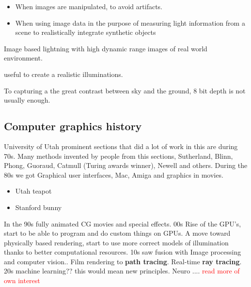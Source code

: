 \begin{itemize}
	\item When images are manipulated, to avoid artifacts.
	\item When using image data in the purpose of measuring light information from a scene to realistically integrate synthetic objects 
\end{itemize}


Image based lightning with high dynamic range images of real world environment. 

useful to create a realistic illuminations. 

To capturing a the great contrast between sky and the ground, 8 bit depth is not usually enough.  

\subsection*{Computer graphics history}
University of Utah prominent sections that did a lot of work in this are during 70s. Many methods invented by people from this sections, Sutherland, Blinn, Phong, Guoraud, Catmull (Turing awards winner), Newell and others. During the 80s we got Graphical user interfaces, Mac, Amiga and graphics in movies. 

\begin{itemize}
	\item Utah teapot
	\item Stanford bunny
\end{itemize}

In the 90s fully animated CG movies and special effects. 00s Rise of the GPU's, start to be able to program and do custom things on GPUs. A move toward physically based rendering, start to use more correct models of illumination thanks to better computational resources. 10s saw fusion with Image processing and computer vision.. Film rendering to \textbf{path tracing}. Real-time \textbf{ray tracing}. 20s machine learning?? this would mean new principles. Neuro .... \textcolor{red}{read more of own interest} 


